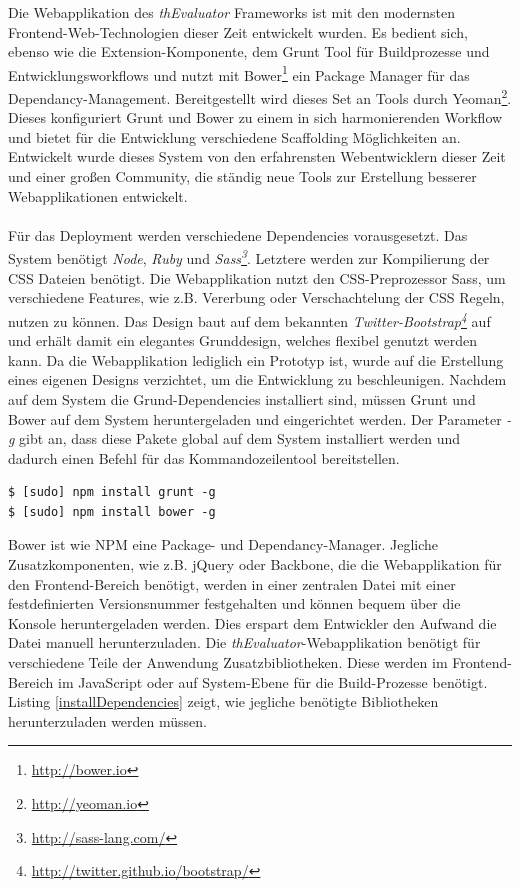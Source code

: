 Die Webapplikation des \textit{thEvaluator} Frameworks ist mit den modernsten Frontend-Web-Technologien dieser Zeit entwickelt wurden. Es bedient sich, ebenso wie die Extension-Komponente, dem Grunt Tool für Buildprozesse und Entwicklungsworkflows und nutzt mit Bower\footnote{\url{http://bower.io}} ein Package Manager für das Dependancy-Management. Bereitgestellt wird dieses Set an Tools durch Yeoman\footnote{\url{http://yeoman.io}}. Dieses konfiguriert Grunt und Bower zu einem in sich harmonierenden Workflow und bietet für die Entwicklung verschiedene Scaffolding Möglichkeiten an. Entwickelt wurde dieses System von den erfahrensten Webentwicklern dieser Zeit und einer großen Community, die ständig neue Tools zur Erstellung besserer Webapplikationen entwickelt.\\
\\
Für das Deployment werden verschiedene Dependencies vorausgesetzt. Das System benötigt \textit{Node}, \textit{Ruby} und \textit{Sass\footnote{\url{http://sass-lang.com/}}}. Letztere werden zur Kompilierung der CSS Dateien benötigt. Die Webapplikation nutzt den CSS-Preprozessor Sass, um verschiedene Features, wie z.B. Vererbung oder Verschachtelung der CSS Regeln, nutzen zu können. Das Design baut auf dem bekannten \textit{Twitter-Bootstrap\footnote{\url{http://twitter.github.io/bootstrap/}}} auf und erhält damit ein elegantes Grunddesign, welches flexibel genutzt werden kann. Da die Webapplikation lediglich ein Prototyp ist, wurde auf die Erstellung eines eigenen Designs verzichtet, um die Entwicklung zu beschleunigen. Nachdem auf dem System die Grund-Dependencies installiert sind, müssen Grunt und Bower auf dem System heruntergeladen und eingerichtet werden. Der Parameter \textit{-g} gibt an, dass diese Pakete global auf dem System installiert werden und dadurch einen Befehl für das Kommandozeilentool bereitstellen.

\vspace{1cm}
\begin{lstlisting}[caption=Installation von Grunt und Bower auf dem System,label=installPackages]
$ [sudo] npm install grunt -g
$ [sudo] npm install bower -g
\end{lstlisting}
\vspace{1cm}

Bower ist wie NPM eine Package- und Dependancy-Manager. Jegliche Zusatzkomponenten, wie z.B. jQuery oder Backbone, die die Webapplikation für den Frontend-Bereich benötigt, werden in einer zentralen Datei mit einer festdefinierten Versionsnummer festgehalten und können bequem über die Konsole heruntergeladen werden. Dies erspart dem Entwickler den Aufwand die Datei manuell herunterzuladen. Die \textit{thEvaluator}-Webapplikation benötigt für verschiedene Teile der Anwendung Zusatzbibliotheken. Diese werden im Frontend-Bereich im JavaScript oder auf System-Ebene für die Build-Prozesse benötigt. Listing \ref{installDependencies} zeigt, wie jegliche benötigte Bibliotheken herunterzuladen werden müssen.

